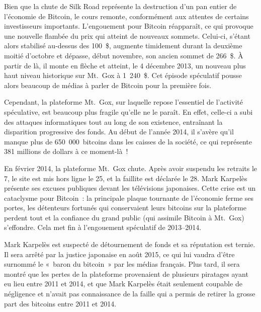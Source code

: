 Bien que la chute de Silk Road représente la destruction d'un pan entier de l'économie de Bitcoin, le cours remonte, conformément aux attentes de certains investisseurs importants. L'engouement pour Bitcoin réapparaît, ce qui provoque une nouvelle flambée du prix qui atteint de nouveaux sommets. Celui-ci, s'étant alors stabilisé au-dessus des 100~\$, augmente timidement durant la deuxième moitié d'octobre et dépasse, début novembre, son ancien sommet de 266~\$. À partir de là, il monte en flèche et atteint, le 4 décembre 2013, un nouveau plus haut niveau historique sur Mt.~Gox à 1~240~\$. Cet épisode spéculatif pousse alors beaucoup de médias à parler de Bitcoin pour la première fois.

Cependant, la plateforme Mt.~Gox, sur laquelle repose l'essentiel de l'activité spéculative, est beaucoup plus fragile qu'elle ne le paraît. En effet, celle-ci a subi des attaques informatiques tout au long de son existence, entraînant la disparition progressive des fonds. Au début de l'année 2014, il s'avère qu'il manque plus de 650~000~bitcoins dans les caisses de la société, ce qui représente 381 millions de dollars à ce moment-là~!

En février 2014, la plateforme Mt.~Gox chute. Après avoir suspendu les retraits le 7, le site est mis hors ligne le 25, et la faillite est déclarée le 28. Mark Karpelès présente ses excuses publiques devant les télévisions japonaises. Cette crise est un cataclysme pour Bitcoin~: la principale plaque tournante de l'économie ferme ses portes, les détenteurs fortunés qui conservaient leurs bitcoins sur la plateforme perdent tout et la confiance du grand public (qui assimile Bitcoin à Mt.~Gox) s'effondre. Cela met fin à l'engouement spéculatif de 2013--2014.

Mark Karpelès est suspecté de détournement de fonds et sa réputation est ternie. Il sera arrêté par la justice japonaise en août 2015, ce qui lui vaudra d'être surnommé le «~baron du bitcoin~» par les médias français. Plus tard, il sera montré que les pertes de la plateforme provenaient de plusieurs piratages ayant eu lieu entre 2011 et 2014, et que Mark Karpelès était seulement coupable de négligence et n'avait pas connaissance de la faille qui a permis de retirer la grosse part des bitcoins entre 2011 et 2014. %

